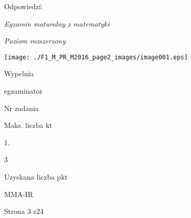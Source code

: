 \documentclass[a4paper,12pt]{article}
\begin{document}
Odpowiedzí:

{\it Egzamin maturalny z matematyki}

{\it Poziom rozszerzony}
\begin{center}
\texttt{[image: ./F1\_M\_PR\_M2016\_page2\_images/image001.eps]}
\end{center}
Wypelnia

egzaminator

Nr zadania

Maks. liczba kt

1.

3

Uzyskana liczba pkt

MMA-IR

Strona 3 z24
\end{document}

